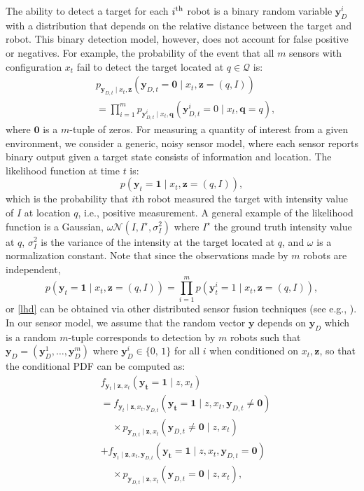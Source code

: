 \documentclass[letterpaper, 10 pt, conference]{ieeeconf}
\begin{document}
The ability to detect a target for each $i^{\textup{th}}$ robot is a binary random variable $\bm{y}_D^i$ with a distribution that depends on the relative distance between the target and robot. 
This binary detection model, however, does not account for false positive or negatives.
For example, the probability of the event that all $m$ sensors with configuration $x_t$ fail to detect the target located at $q \in \mathcal{Q}$ is:
\begin{align}
&p_{\bm{y}_{D,t} \mid
	{x}_{t},\bm{z}}\left(
\bm{y}_{D,t} = \bm{0} \mid {x}_{t},
\bm{z}=(q,I)\right) \nonumber \\
&= \prod_{i =1 }^{m}
p_{\bm{y}_{D,t}^i \mid
	{x}_{t},\bm{q}}\left(
\bm{y}_{D,t}^i = 0 \mid
{x}_{t},\bm{q}=q\right), \nonumber
\end{align}
where $\bm{0}$ is a $m$-tuple of zeros. For measuring a quantity of interest from a given environment, we consider a generic, noisy sensor model, where each sensor reports
binary output given a target state consists of information and location.
The likelihood function at time $t$ is:
\begin{equation}
p(\bm{y}_t = \bm{1} \mid x_t, \bm{z} = (q,I)),
\label{lhd}
\end{equation}
which is the probability that $i$th robot measured the target 
with intensity value of $I$ at location $q$, i.e., positive measurement.
A general example of the likelihood function is a Gaussian, $\omega\mathcal{N}(I,I^{\star},\sigma_I^2)$ where $I^{\star}$ the ground truth intensity value at $q$, $\sigma_I^2$ is the variance of the intensity at the target located at $q$, and $\omega$ is a normalization constant. Note that since the observations made by $m$ robots are independent,
\[
p(\bm{y}_t = \bm{1} \mid x_t, \bm{z} = (q,I)) =
\prod_{i=1}^m
p(\bm{y}_t^i = 1 \mid x_t, \bm{z} = (q,I)),
\] 
or \eqref{lhd} can be obtained via other distributed sensor fusion techniques (see e.g., \cite{stroupe2001distributed}).
In our sensor model, we assume that the random vector $\bm{y}$ depends on $\bm{y}_D$ which is a random $m$-tuple corresponds to detection by $m$ robots such that $\bm{y}_D = (\bm{y}_D^1,\dots,\bm{y}_D^m)$ where $\bm{y}_D^i \in \lbrace 0,\,1 \rbrace$ for all $i$ when conditioned on $x_t,\bm{z}$, so that the conditional PDF can be computed as:
\begin{align*}
&f_{\bm{y}_t \mid \bm{z},x_{t}}(\bm{y_t}=\bm{1} \mid z,x_{t}) \\
&=f_{\bm{y}_t \mid \bm{z},x_{t},\bm{y}_{D,t}}(\bm{y_t}=\bm{1} \mid z,x_{t},\bm{y}_{D,t} \neq \mathbf{0}) \\ 
&\,\,\,\,\,\,\,\times p_{\bm{y}_{D,t} \mid \bm{z},x_{t}}(\bm{y}_{D,t} \neq \mathbf{0} \mid z,x_{t}) \nonumber\\
&+f_{\bm{y}_t \mid \bm{z},x_{t},\bm{y}_{D,t}}(\bm{y_t}=\bm{1} \mid z,x_{t},\bm{y}_{D,t}=\mathbf{0}) \\
&\,\,\,\,\,\,\,\times p_{\bm{y}_{D,t} \mid \bm{z},x_{t}}(\bm{y}_{D,t} =\mathbf{0} \mid z,x_{t}), \nonumber
\end{align*}
\end{document}
